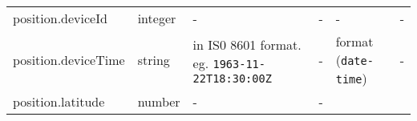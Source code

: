 \documentclass[
]{article}
\begin{document}
\begin{longtable}[]{@{}llllll@{}}
\begin{minipage}[t]{0.14\columnwidth}
position.deviceId\strut
\end{minipage} & \begin{minipage}[t]{0.14\columnwidth}\raggedright
integer\strut
\end{minipage} & \begin{minipage}[t]{0.14\columnwidth}\raggedright
-\strut
\end{minipage} & \begin{minipage}[t]{0.14\columnwidth}\raggedright
-\strut
\end{minipage} & \begin{minipage}[t]{0.14\columnwidth}\raggedright
-\strut
\end{minipage} & \begin{minipage}[t]{0.14\columnwidth}\raggedright
-\strut
\end{minipage}\tabularnewline
\begin{minipage}[t]{0.14\columnwidth}\raggedright
position.deviceTime\strut
\end{minipage} & \begin{minipage}[t]{0.14\columnwidth}\raggedright
string\strut
\end{minipage} & \begin{minipage}[t]{0.14\columnwidth}\raggedright
in IS0 8601 format. eg. \texttt{1963-11-22T18:30:00Z}\strut
\end{minipage} & \begin{minipage}[t]{0.14\columnwidth}\raggedright
-\strut
\end{minipage} & \begin{minipage}[t]{0.14\columnwidth}\raggedright
format (\texttt{date-time})\strut
\end{minipage} & \begin{minipage}[t]{0.14\columnwidth}\raggedright
-\strut
\end{minipage}\tabularnewline
\begin{minipage}[t]{0.14\columnwidth}\raggedright
position.latitude\strut
\end{minipage} & \begin{minipage}[t]{0.14\columnwidth}\raggedright
number\strut
\end{minipage} & \begin{minipage}[t]{0.14\columnwidth}\raggedright
-\strut
\end{minipage} & \begin{minipage}[t]{0.14\columnwidth}\raggedright
-\strut
\end{minipage} & \begin{minipage}[t]{0.14\columnwidth}\raggedright

\end{minipage}
\end{longtable}
\end{document}
